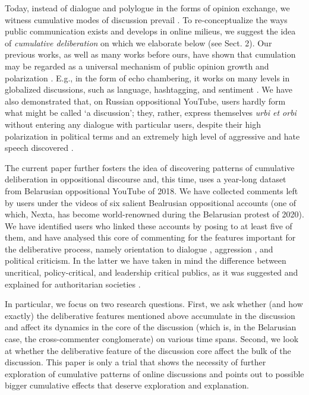 Today, instead of dialogue and polylogue in the forms of opinion exchange, we witness cumulative modes of discussion prevail \cite{BodrunovaLitvinenkoBlekanov2021}. To re-conceptualize the ways public communication exists and develops in online milieus, we suggest the idea of \textit{cumulative deliberation} on which we elaborate below (see Sect. 2). Our previous works, as well as many works before ours, have shown that cumulation may be regarded as a universal mechanism of public opinion growth and polarization \cite{BodrunovaBlekanovSmoliarova}. E.g., in the form of echo chambering, it works on many levels in globalized discussions, such as language, hashtagging, and sentiment \cite{BodrunovaBlekanovKukarkinCH}. We have also demonstrated that, on Russian oppositional YouTube, users hardly form what might be called ‘a discussion’; they, rather, express themselves \textit{urbi et orbi} without entering any dialogue with particular users, despite their high polarization in political terms and an extremely high level of aggressive and hate speech discovered \cite{BodrunovaLitvinenkoBlekanov2021}.

The current paper further fosters the idea of discovering patterns of cumulative deliberation in oppositional discourse and, this time, uses a year-long dataset from Belarusian oppositional YouTube of 2018. We have collected comments left by users under the videos of six salient Bealrusian oppositional accounts (one of which, Nexta, has become world-renowned during the Belarusian protest of 2020). We have identified users who linked these accounts by posing to at least five of them, and have analysed this core of commenting for the features important for the deliberative process, namely orientation to dialogue \cite{Ksiazek}, aggression \cite{BodrunovaLitvinenkoBlekanov2021,KsiazekPeerZivic}, and political criticism. In the latter we have taken in mind the difference between uncritical, policy-critical, and leadership critical publics, as it was suggested and explained for authoritarian societies \cite{Toepfl}.

In particular, we focus on two research questions. First, we ask whether (and how exactly) the deliberative features mentioned above accumulate in the discussion and affect its dynamics in the core of the discussion (which is, in the Belarusian case, the cross-commenter conglomerate) on various time spans. Second, we look at whether the deliberative feature of the discussion core affect the bulk of the discussion. This paper is only a trial that shows the necessity of further exploration of cumulative patterns of online discussions and points out to possible bigger cumulative effects that deserve exploration and explanation.


